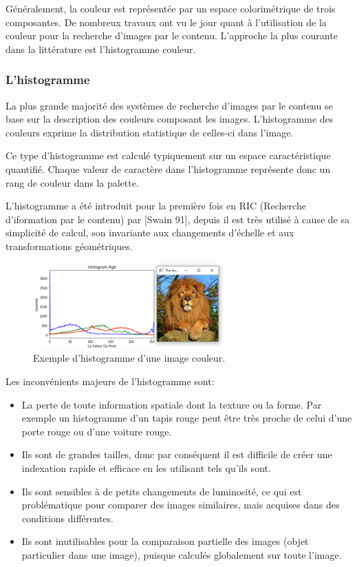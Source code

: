 Généralement, la couleur est représentée par un espace colorimétrique de trois composantes. De nombreux travaux ont vu le jour quant à l’utilisation de la couleur pour la recherche d’images par le contenu. L’approche la plus courante dans la littérature est l’histogramme couleur.

\subsubsection{L'histogramme}
La plus grande majorité des systèmes de recherche d'images par le contenu se base sur la description des couleurs composant les images. L'histogramme des couleurs exprime la distribution statistique de celles-ci dans l'image.

Ce type d'histogramme est calculé typiquement sur un espace caractéristique quantifié. Chaque valeur de caractère dans l'histogramme représente donc un rang de couleur dans la palette. 

L'histogramme a été introduit pour la première fois en RIC (Recherche d'iformation par le contenu) par [Swain 91], depuis il est très utilisé à cause de sa simplicité de calcul, son invariante aux changements d'échelle et aux transformations géométriques.\\

\begin{figure}[H]
	\label{fig:hist}
	\centering
	\includegraphics[width=0.65\textwidth]{Figures/hist} %
	\caption{Exemple d’histogramme d’une image couleur.}
\end{figure}

Les inconvénients majeurs de l'histogramme sont:
\begin{itemize}
	\item La perte de toute information spatiale dont la texture ou la forme. Par exemple un histogramme d'un tapis rouge peut être très proche de celui d'une porte rouge ou d'une voiture rouge.
	
	\item Ils sont de grandes tailles, donc par conséquent il est difficile de créer une indexation rapide et efficace en les utilisant tels qu'ils sont. 
	
	\item Ils sont sensibles à de petits changements de luminosité, ce qui est problématique pour comparer des images similaires, mais acquises dans des conditions différentes. 
	
	\item Ils sont inutilisables pour la comparaison partielle des images (objet particulier dans une image), puisque calculés globalement sur toute l’image.
	
\end{itemize}

